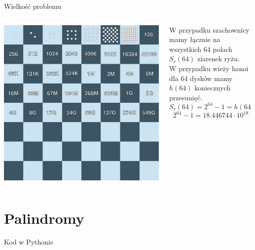 \begin{frame}{Wielkość problemu}
    \centering
    \begin{columns}
        \begin{column}{0.5\textwidth}
            \includegraphics[height=0.7\textheight]{graphics/recursion/chessboard2.png}
        \end{column}
        \begin{column}{0.5\textwidth}
            W przypadku szachownicy mamy łącznie na wszystkich 64 polach $S_r(64)$ ziarenek ryżu. \\
            W przypadku wieży hanoi dla 64 dysków mamy $h(64)$ koniecznych przesunięć.
            \[ S_r(64) = 2^{64} - 1 = h(64) \]
            \[ 2^{64} - 1 = 18.446744 \cdot 10^{18} \]
        \end{column}
    \end{columns}
\end{frame}
\section{Palindromy}\label{sec:palindromy}
\begin{frame}[fragile]{Kod w Pythonie}
    
\end{frame}
